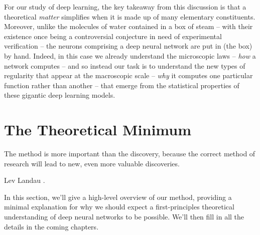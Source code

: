  










For our study of deep learning, the key takeaway from this discussion is that 
a theoretical \emph{matter} %
simplifies when it is made up of many elementary constituents. Moreover, unlike the molecules of water contained in a box of steam -- with their existence once being a controversial conjecture in need of experimental verification  -- the neurons comprising a deep neural network are put in
(the box)
by hand. Indeed, in this case we already understand the microscopic laws -- \emph{how} a network computes -- and so instead our task is to understand the new types of regularity that appear at the macroscopic scale -- \emph{why} it computes one particular function rather than another -- that emerge from the statistical properties of these gigantic deep learning models. %































\section{The Theoretical Minimum}\label{sec:why-it-works}
\epigraph{The method is more important than the discovery, because the correct method of research will lead to new, even more valuable discoveries.}{Lev Landau \cite{landau}.}

\noindent{}In this section, we'll give a high-level overview of our method, providing a minimal explanation for why we should expect a first-principles theoretical understanding of deep neural networks to be possible.
We'll then fill in all the details in the coming chapters.














